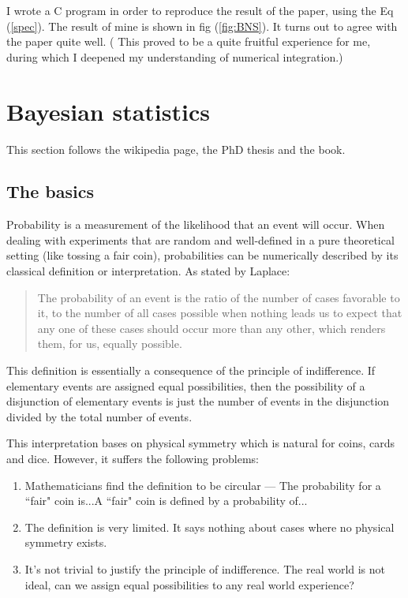 \documentclass[11pt, a4paper]{article}
\begin{document}
I wrote a C program in order to reproduce the result of the paper\cite{Wu2012}, using the Eq (\ref{spec}). The result of mine is shown in fig (\ref{fig:BNS}). It turns out to agree with the paper quite well. ( This proved to be a quite fruitful experience for me, during which I deepened my understanding of numerical integration.)
\section{Bayesian statistics}\label{sec:Bay}
\quad
This section follows the wikipedia page\cite{wiki:pro}, the PhD thesis\cite{liextracting} and the book\cite{book:sivia}.

\subsection{The basics}
\quad
Probability is a measurement of the likelihood that an event will occur. When dealing with experiments that are random and well-defined in a pure theoretical setting (like tossing a fair coin), probabilities can be numerically described by its classical definition or interpretation. As stated by Laplace:
\begin{quotation}
The probability of an event is the ratio of the number of cases favorable to it, to the number of all cases possible when nothing leads us to expect that any one of these cases  should occur more than any other, which renders them, for us, equally possible.
\end{quotation}
This definition is essentially a consequence of the principle of indifference. If elementary events are assigned equal possibilities, then the possibility of a disjunction of elementary events is just the number of events in the disjunction divided by the total number of events. 

This interpretation bases on physical symmetry which is natural for coins, cards and dice. However, it suffers the following problems:
\begin{enumerate}
\item Mathematicians find the definition to be circular --- The probability for a ``fair" coin is...A ``fair" coin is defined by a probability of...
\item The definition is very limited. It says nothing about cases where no physical symmetry exists.
\item It's not trivial to justify the principle of indifference. The real world is not ideal, can we assign equal possibilities to any real world experience?
\end{enumerate}
\end{document}

